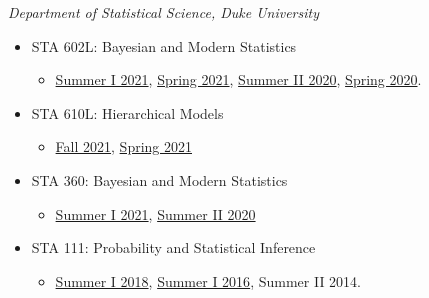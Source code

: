 \documentclass[12pt]{article}
\begin{document}
{\textit{Department of Statistical Science, Duke University}
\begin{itemize}[noitemsep,topsep=3pt]
	\item STA 602L: Bayesian and Modern Statistics
	\begin{itemize}[noitemsep,topsep=3pt]
		\item \href{https://sta-360-602l-su21.github.io/Course-Website/}{Summer I 2021}, \href{https://sta-602l-s21.github.io/Course-Website/}{Spring 2021}, \href{https://sta-360-602l-su20.github.io/Course-Website/}{Summer II 2020}, \href{https://sta-602l-s20.github.io/Course-Website/}{Spring 2020}.
	\end{itemize}
	\item STA 610L: Hierarchical Models
	\begin{itemize}[noitemsep,topsep=3pt]
		\item \href{https://sta610-f21.olanrewajuakande.com}{Fall 2021}, \href{https://sta-610l-s21.github.io/Course-Website/}{Spring 2021}
	\end{itemize}
	\item STA 360: Bayesian and Modern Statistics
	\begin{itemize}[noitemsep,topsep=3pt]
		\item \href{https://sta-360-602l-su21.github.io/Course-Website/}{Summer I 2021}, \href{https://sta-360-602l-su20.github.io/Course-Website/}{Summer II 2020}
	\end{itemize}
	\item STA 111: Probability and Statistical Inference
	\begin{itemize}[noitemsep,topsep=3pt]
		\item \href{https://www.olanrewajuakande.com/STA111-Summer2018-Course-Website/}{Summer I 2018}, \href{https://www.olanrewajuakande.com/STA111-Summer2016-Course-Website/}{Summer I 2016}, Summer II 2014.\\
	\end{itemize}
\end{itemize}



}
\end{document}

